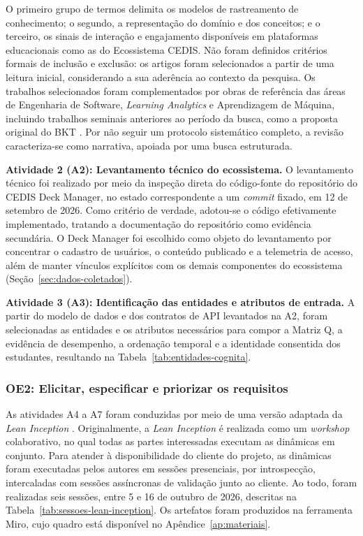 O primeiro grupo de termos delimita os modelos de rastreamento de conhecimento; o segundo, a representação do domínio e dos conceitos; e o terceiro, os sinais de interação e engajamento disponíveis em plataformas educacionais como as do Ecossistema CEDIS. Não foram definidos critérios formais de inclusão e exclusão: os artigos foram selecionados a partir de uma leitura inicial, considerando a sua aderência ao contexto da pesquisa. Os trabalhos selecionados foram complementados por obras de referência das áreas de Engenharia de Software, \textit{Learning Analytics} e Aprendizagem de Máquina, incluindo trabalhos seminais anteriores ao período da busca, como a proposta original do BKT \cite{corbett_knowledge_1994}. Por não seguir um protocolo sistemático completo, a revisão caracteriza-se como narrativa, apoiada por uma busca estruturada.

\textbf{Atividade 2 (A2): Levantamento técnico do ecossistema.} O levantamento técnico foi realizado por meio da inspeção direta do código-fonte do repositório do CEDIS Deck Manager, no estado correspondente a um \textit{commit} fixado, em 12 de setembro de 2026. Como critério de verdade, adotou-se o código efetivamente implementado, tratando a documentação do repositório como evidência secundária. O Deck Manager foi escolhido como objeto do levantamento por concentrar o cadastro de usuários, o conteúdo publicado e a telemetria de acesso, além de manter vínculos explícitos com os demais componentes do ecossistema (Seção~\ref{sec:dados-coletados}).

\textbf{Atividade 3 (A3): Identificação das entidades e atributos de entrada.} A partir do modelo de dados e dos contratos de API levantados na A2, foram selecionadas as entidades e os atributos necessários para compor a Matriz Q, a evidência de desempenho, a ordenação temporal e a identidade consentida dos estudantes, resultando na Tabela~\ref{tab:entidades-cognita}.

\subsubsection{OE2: Elicitar, especificar e priorizar os requisitos}
\label{subsubsec:oe2}

As atividades A4 a A7 foram conduzidas por meio de uma versão adaptada da \textit{Lean Inception} \cite{caroli_lean_2018}. Originalmente, a \textit{Lean Inception} é realizada como um \textit{workshop} colaborativo, no qual todas as partes interessadas executam as dinâmicas em conjunto. Para atender à disponibilidade do cliente do projeto, as dinâmicas foram executadas pelos autores em sessões presenciais, por introspecção, intercaladas com sessões assíncronas de validação junto ao cliente. Ao todo, foram realizadas seis sessões, entre 5 e 16 de outubro de 2026, descritas na Tabela~\ref{tab:sessoes-lean-inception}. Os artefatos foram produzidos na ferramenta Miro, cujo quadro está disponível no Apêndice~\ref{ap:materiais}.

